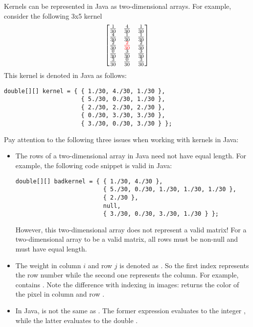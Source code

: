 \documentclass{book}
\begin{document}
Kernels can be represented in Java as two-dimensional arrays. For example, consider the following 3x5 kernel 
$$
 \begin{bmatrix}
  \frac{1}{30} & \frac{4}{30} & \frac{1}{30} \\
  \frac{4}{30} & \frac{1}{30} & \frac{1}{30} \\
  \frac{2}{30} & \textcolor{red}{\frac{2}{30}} & \frac{2}{30}\\
  \frac{0}{30} & \frac{3}{30} & \frac{3}{30}\\
  \frac{3}{30} & \frac{0}{30} & \frac{3}{30}\\
 \end{bmatrix}
$$
This kernel is denoted in Java as follows:
\begin{lstlisting}
double[][] kernel = { { 1./30, 4./30, 1./30 },
                      { 5./30, 0./30, 1./30 },
                      { 2./30, 2./30, 2./30 },
                      { 0./30, 3./30, 3./30 },
                      { 3./30, 0./30, 3./30 } };
\end{lstlisting}
Pay attention to the following three issues when working with kernels in Java:
\begin{itemize}
  \item The rows of a two-dimensional array in Java need not have equal length. For example, the following code snippet is valid in Java:
\begin{lstlisting}
double[][] badkernel = { { 1./30, 4./30 },
                         { 5./30, 0./30, 1./30, 1./30, 1./30 },
                         { 2./30 },
                         null,
                         { 3./30, 0./30, 3./30, 1./30 } };
\end{lstlisting}
However, this two-dimensional array does not represent a valid matrix! For a two-dimensional array to be a valid matrix, all rows must be non-null and must have equal length.
  \item The weight in column $i$ and row $j$ is denoted as . So the first index represents the row number while the second one represents the column. For example,  contains . Note the difference with indexing in images:  returns the color of the pixel in column  and row .
  \item In Java,  is not the same as . The former expression evaluates to the integer , while the latter evaluates to the double .
\end{itemize}
\end{document}
